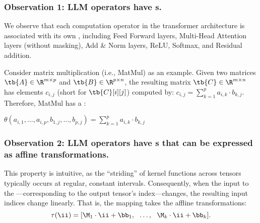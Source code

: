\subsubsection{Observation 1: LLM operators have \kfunc{}s.}
We observe that each computation operator in the transformer architecture is associated with its own \kfunc,
including Feed Forward layers,
Multi-Head Attention layers (without masking),
Add \& Norm layers, ReLU, Softmax,
and Residual addition.

Consider matrix multiplication (i.e., MatMul) as an example.
Given two matrices $\tb{A} \in \R^{m \times p}$ and $\tb{B} \in \R^{p \times n}$,
the resulting matrix $\tb{C} \in \R^{m \times n}$ has elements $c_{i,j}$ (short for $\tb{C}[i][j]$)
computed by:
$c_{i,j} = \sum_{k=1}^{p} a_{i,k} \cdot b_{k,j}$.
Therefore, MatMul has a \kfunc:
\begin{center}
$\theta(a_{i,1},\dots, a_{i,p}, b_{1,j}, \dots, b_{p,j}) = \sum_{k=1}^{p} a_{i,k} \cdot b_{k,j}$
\end{center}

\subsubsection{Observation 2: LLM operators have \depmap{}s that can be expressed as
affine transformations.}
This property is intuitive, as the ``striding'' of kernel functions across
tensors typically occurs at regular, constant intervals.
Consequently, when the input to the \depmap---corresponding to the output tensor's index---changes,
the resulting input indices change linearly.
That is, the mapping takes the affline transformations:
\[
    \tau(\ii) = [\M_1\cdot \ii + \bb_1, \ \ \dots,\ \  \M_k\cdot \ii + \bb_k].
\]

